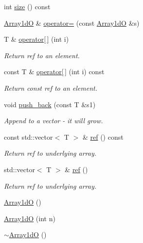 \begin{DoxyCompactItemize}
\item 
int \mbox{\hyperlink{classADAT_1_1Array1dO_a749307d8e42867d6fac39dc9aca84978}{size}} () const
\item 
\mbox{\hyperlink{classADAT_1_1Array1dO}{Array1dO}} \& \mbox{\hyperlink{classADAT_1_1Array1dO_a387ca64e93f23d140b38bd42e81d05a8}{operator=}} (const \mbox{\hyperlink{classADAT_1_1Array1dO}{Array1dO}} \&s)
\item 
T \& \mbox{\hyperlink{classADAT_1_1Array1dO_a3ec54ce2ab12d922d155e37d1f63a010}{operator\mbox{[}$\,$\mbox{]}}} (int i)
\begin{DoxyCompactList}\small\item\em Return ref to an element. \end{DoxyCompactList}\item 
const T \& \mbox{\hyperlink{classADAT_1_1Array1dO_a48b2dbd0a7e4ee5dce18a12ca19d78be}{operator\mbox{[}$\,$\mbox{]}}} (int i) const
\begin{DoxyCompactList}\small\item\em Return const ref to an element. \end{DoxyCompactList}\item 
void \mbox{\hyperlink{classADAT_1_1Array1dO_a6e326e7686f842918f3cbda5c6a4b05f}{push\+\_\+back}} (const T \&s1)
\begin{DoxyCompactList}\small\item\em Append to a vector -\/ it will grow. \end{DoxyCompactList}\item 
const std\+::vector$<$ T $>$ \& \mbox{\hyperlink{classADAT_1_1Array1dO_a3b74880db3b0d48e29fb28f80a283352}{ref}} () const
\begin{DoxyCompactList}\small\item\em Return ref to underlying array. \end{DoxyCompactList}\item 
std\+::vector$<$ T $>$ \& \mbox{\hyperlink{classADAT_1_1Array1dO_ac3ff9b35bef8e7fa276136673b907749}{ref}} ()
\begin{DoxyCompactList}\small\item\em Return ref to underlying array. \end{DoxyCompactList}\item 
\mbox{\hyperlink{classADAT_1_1Array1dO_af55d30db029bb654a123544dfc155e6a}{Array1dO}} ()
\item 
\mbox{\hyperlink{classADAT_1_1Array1dO_abd486987192b85b2cd27fd28660168bf}{Array1dO}} (int n)
\item 
\mbox{\hyperlink{classADAT_1_1Array1dO_a4abf4e2555ad2189b5000e323f0f99e8}{$\sim$\+Array1dO}} ()

\end{DoxyCompactItemize}
